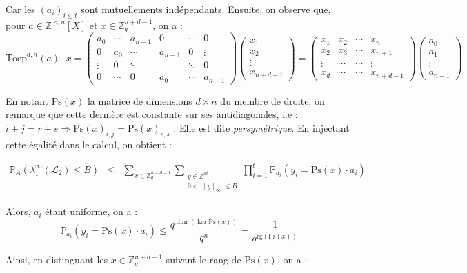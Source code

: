 \documentclass[11pt,a4paper]{article}
\begin{document}
Car les $(a_i)_{i\leq t}$ sont mutuellements indépendants. Ensuite, on observe que, pour $a \in \mathbb{Z}^{<n}[X]$ et $x \in \mathbb{Z}_q^{n+d-1}$, on a : 
$$ \text{Toep}^{d,n}(a) \cdot  x =  \begin{pmatrix}
a_0 & \cdots & a_{n-1} &0 & \cdots&  0 \\
0 & a_0 & \cdots & a_{n-1} & 0 &\vdots \\
\vdots & 0 & \ddots & & \ddots & 0  \\
0 & \cdots & 0 & a_0 & \cdots & a_{n-1} 

\end{pmatrix} 
\begin{pmatrix}
x_{1} \\
x_{2} \\
\vdots \\
x_{n+d-1}
\end{pmatrix} 
=
\begin{pmatrix}
x_1 & x_2 & \cdots & x_n \\
x_2 & x_3 & \cdots & x_{n+1} \\
\vdots & \cdots & \cdots & \vdots \\
x_d & \cdots & \cdots & x_{n+d-1} 
\end{pmatrix}
\begin{pmatrix}
a_{0} \\
a_{1} \\
\vdots \\
a_{n-1}
\end{pmatrix}
$$

En notant $\text{Ps}(x)$ la matrice de dimensions $d\times n$ du membre de droite, on remarque que cette dernière est constante sur ses antidiagonales, i.e : $ i+j=r+s \Rightarrow \text{Ps}(x)_{i,j}=\text{Ps}(x)_{r,s}$ . Elle est dite \textit{persymétrique}. En injectant cette égalité dans le calcul, on obtient : 

\begin{eqnarray*}
\mathbb{P}_A(\lambda_1^\infty(\mathcal{L}_2) \leq B) &\leq& \sum_{x \in \mathbb{Z}_q^{n+d-1}} \sum_{\substack{y \in \mathbb{Z}^{dt} \\ 0 < \|y\|_\infty \leq B}} \prod_{i=1}^t \mathbb{P}_{a_i}(y_i = \text{Ps}(x) \cdot  a_i)
\end{eqnarray*}

Alors, $a_i$ étant uniforme, on a : 
 \[ \mathbb{P}_{a_i}(y_i = \text{Ps}(x) \cdot  a_i) \leq \frac{q^{\dim(\ker{\text{Ps}(x)})}}{q^n} = \frac{1}{q^{\text{rg}(\text{Ps}(x))}}\]

Ainsi, en distinguant les $x\in \mathbb{Z}_q^{n+d-1}$ suivant le rang de $\text{Ps}(x)$, on a :
\end{document}
